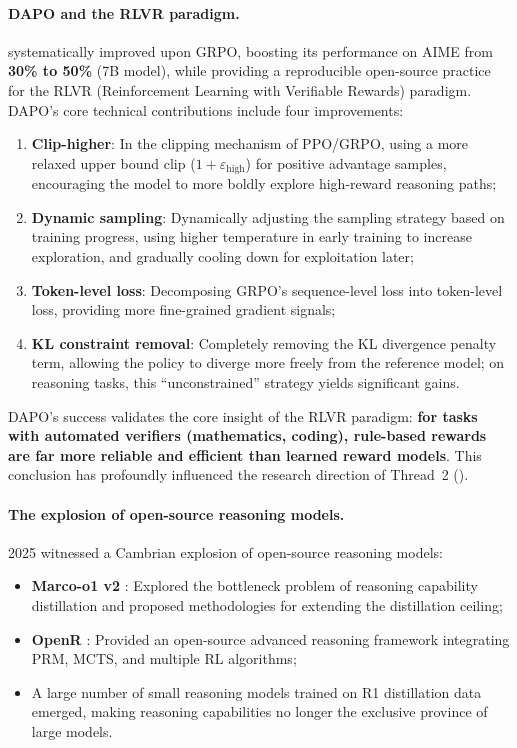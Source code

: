 \paragraph{DAPO and the RLVR paradigm.}
 systematically improved upon GRPO,
boosting its performance on AIME from \textbf{30\% to 50\%} (7B model),
while providing a reproducible open-source practice for the
RLVR (Reinforcement Learning with Verifiable Rewards) paradigm.
DAPO's core technical contributions include four improvements:
\begin{enumerate}[leftmargin=2em]
  \item \textbf{Clip-higher}: In the clipping mechanism of PPO/GRPO,
    using a more relaxed upper bound clip ($1 + \varepsilon_{\text{high}}$) for positive advantage samples,
    encouraging the model to more boldly explore high-reward reasoning paths;
  \item \textbf{Dynamic sampling}: Dynamically adjusting the sampling strategy based on training progress,
    using higher temperature in early training to increase exploration, and gradually cooling down for exploitation later;
  \item \textbf{Token-level loss}: Decomposing GRPO's sequence-level loss
    into token-level loss, providing more fine-grained gradient signals;
  \item \textbf{KL constraint removal}: Completely removing the KL divergence penalty term,
    allowing the policy to diverge more freely from the reference model;
    on reasoning tasks, this ``unconstrained'' strategy yields significant gains.
\end{enumerate}
DAPO's success validates the core insight of the RLVR paradigm:
\textbf{for tasks with automated verifiers (mathematics, coding),
rule-based rewards are far more reliable and efficient than learned reward models}.
This conclusion has profoundly influenced the research direction of Thread~2 ().

\paragraph{The explosion of open-source reasoning models.}
2025 witnessed a Cambrian explosion of open-source reasoning models:
\begin{itemize}[leftmargin=2em]
  \item \textbf{Marco-o1 v2} \cite{yin2025marcoo1v2}:
    Explored the bottleneck problem of reasoning capability distillation
    and proposed methodologies for extending the distillation ceiling;
  \item \textbf{OpenR} \cite{wang2024openr}:
    Provided an open-source advanced reasoning framework
    integrating PRM, MCTS, and multiple RL algorithms;
  \item A large number of small reasoning models trained on R1 distillation data emerged,
    making reasoning capabilities no longer the exclusive province of large models.
\end{itemize}

